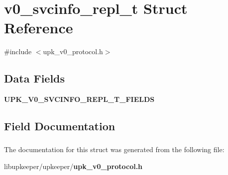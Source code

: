\section{v0\_\-svcinfo\_\-repl\_\-t Struct Reference}
\label{structv0__svcinfo__repl__t}


{\ttfamily \#include $<$upk\_\-v0\_\-protocol.h$>$}

\subsection*{Data Fields}
\begin{DoxyCompactItemize}
\item 
{\bf UPK\_\-V0\_\-SVCINFO\_\-REPL\_\-T\_\-FIELDS}
\end{DoxyCompactItemize}


\subsection{Field Documentation}
\subsubsection[{UPK\_\-V0\_\-SVCINFO\_\-REPL\_\-T\_\-FIELDS}]{}\label{structv0__svcinfo__repl__t_a526fb6ef601375e6c37d6ff3b947e51d}


The documentation for this struct was generated from the following file:\begin{DoxyCompactItemize}
\item 
libupkeeper/upkeeper/{\bf upk\_\-v0\_\-protocol.h}\end{DoxyCompactItemize}
